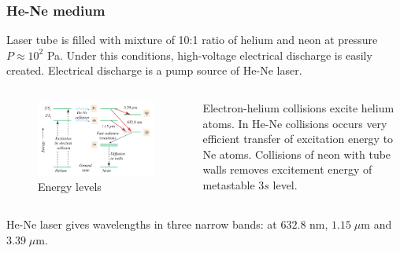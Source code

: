 \documentclass{beamer}
\begin{document}
	\begin{frame}
		\frametitle{He-Ne medium}

		Laser tube is filled with mixture of 10:1 ratio of helium and neon at pressure $P \approx 10^2$ Pa. Under this conditions, high-voltage electrical discharge is easily created. Electrical discharge is a pump source of He-Ne laser.
		
		\begin{columns}
			\begin{figure}
				\includegraphics[width=\linewidth]{res/hene_levels.png}
				\caption{Energy levels}
			\end{figure}
			Electron-helium collisions excite helium atoms. In He-Ne collisions occurs very efficient transfer of excitation energy to Ne atoms. Collisions of neon with tube walls removes excitement energy of metastable $3s$ level.
		\end{columns}
		
		He-Ne laser gives wavelengths in three narrow bands: at $632.8$ nm, $1.15 \; \mu\text{m}$ and $3.39 \; \mu\text{m}$.
	\end{frame}
\end{document}

